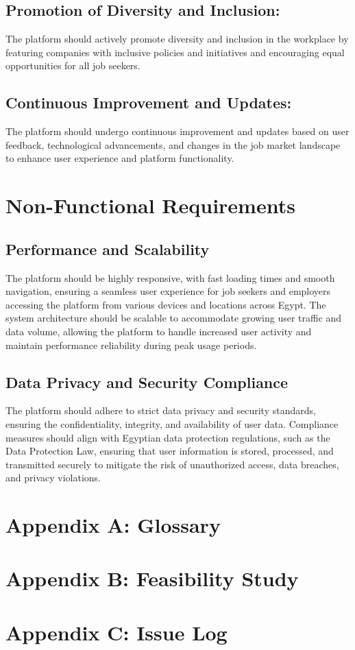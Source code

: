 \documentclass[titlepage]{article}
\begin{document}
\subsection{Promotion of Diversity and Inclusion:}
The platform should actively promote diversity and inclusion in the workplace by featuring companies with inclusive policies and initiatives and encouraging equal opportunities for all job seekers.

\subsection{Continuous Improvement and Updates:}
The platform should undergo continuous improvement and updates based on user feedback, technological advancements, and changes in the job market landscape to enhance user experience and platform functionality.

\section{Non-Functional Requirements}
\subsection{Performance and Scalability}

The platform   should be highly responsive, with fast loading times and smooth navigation, ensuring a seamless user experience for job seekers and employers accessing the platform from various devices and locations across Egypt.
The system architecture should be scalable to accommodate growing user traffic and data volume, allowing the platform to handle increased user activity and maintain performance reliability during peak usage periods.
\subsection{Data Privacy and Security Compliance}

The platform should adhere to strict data privacy and security standards, ensuring the confidentiality, integrity, and availability of user data.
Compliance measures should align with Egyptian data protection regulations, such as the Data Protection Law, ensuring that user information is stored, processed, and transmitted securely to mitigate the risk of unauthorized access, data breaches, and privacy violations.
\appendix
\section{Appendix A: Glossary}
\section{Appendix B: Feasibility Study}
\section{Appendix C: Issue Log}
\end{document}

